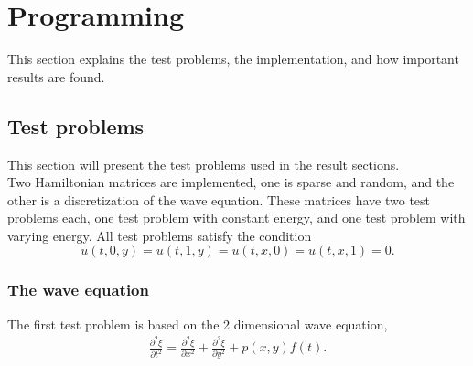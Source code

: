 \chapter{Programming }%
This section explains the test problems, the implementation, and how important results are found.

\section{Test problems} %
\label{sec:testprob}
This section will present the test problems used in the result sections. \\

\noindent Two Hamiltonian matrices are implemented, one is sparse and random, and the other is a discretization of the wave equation. These matrices have two test problems each, one test problem with constant energy, and one test problem with varying energy. All test problems satisfy the condition $$u(t,0,y) = u(t,1,y) = u(t,x,0) = u(t,x,1) = 0.$$ 

\subsection{The wave equation} %
\label{sec:wave}
The first test problem is based on the 2 dimensional wave equation, 
\begin{equation}
\begin{aligned}
\frac{\partial^2 \xi}{\partial t^2} = \frac{\partial^2 \xi}{\partial x^2}+ \frac{\partial^2 \xi}{\partial y^2} + p(x,y)f(t).
\end{aligned}
\label{eqn:wave}
\end{equation}

